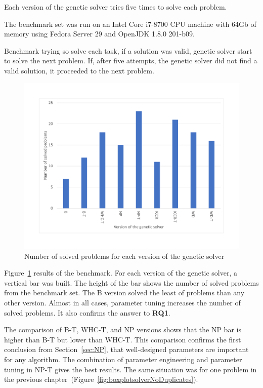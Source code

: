 Each version of the genetic solver tries five times to solve each problem.

The benchmark set was run on an Intel Core i7-8700 CPU machine with 64Gb of memory using Fedora Server 29 and OpenJDK 1.8.0 201-b09.

Benchmark trying so solve each task, if a solution was valid, genetic solver start to solve the next problem. If, after five attempts, the genetic solver did not find a valid solution, it proceeded to the next problem.

\begin{figure}
	\centering
	\includegraphics[width=\textwidth]{images/EvaluationNumberOfSolvedProblems.pdf}
	\caption[Number of problems for each version of the genetic solver]{Number of solved problems for each version of the genetic solver}
	\label{fig:EvaluationNumberOfSolvedProblems}
\end{figure}

Figure~\ref{fig:EvaluationNumberOfSolvedProblems} results of the benchmark. For each version of the genetic solver, a vertical bar was built. The height of the bar shows the number of solved problems from the benchmark set. The B version solved the least of problems than any other version. Almost in all cases, parameter tuning increases the number of solved problems. It also confirms the answer to \textbf{RQ1}. 

The comparison of B-T, WHC-T, and NP versions shows that the NP bar is higher than B-T but lower than WHC-T. This comparison confirms the first conclusion from Section~\ref{sec:NP}, that well-designed parameters are important for any algorithm. The combination of parameter engineering and parameter tuning in NP-T gives the best results. The same situation was for one problem in the previous chapter~(Figure~\ref{fig:boxplotsolverNoDuplicates}). 

